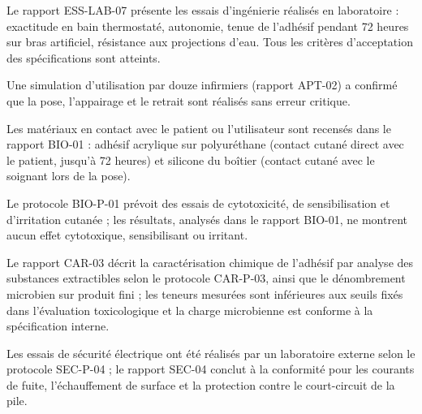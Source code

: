 \documentclass[11pt,a4paper]{article}
\begin{document}
\begin{Form}
\par{}\par

{\small Le rapport ESS-LAB-07 présente les essais d'ingénierie réalisés en laboratoire : exactitude en bain thermostaté, autonomie, tenue de l'adhésif pendant 72 heures sur bras artificiel, résistance aux projections d'eau. Tous les critères d'acceptation des spécifications sont atteints.}\par

{\small Une simulation d'utilisation par douze infirmiers (rapport APT-02) a confirmé que la pose, l'appairage et le retrait sont réalisés sans erreur critique.}\par

\par{}\par

{\small Les matériaux en contact avec le patient ou l'utilisateur sont recensés dans le rapport BIO-01 : adhésif acrylique sur polyuréthane (contact cutané direct avec le patient, jusqu'à 72 heures) et silicone du boîtier (contact cutané avec le soignant lors de la pose).}\par

{\small Le protocole BIO-P-01 prévoit des essais de cytotoxicité, de sensibilisation et d'irritation cutanée ; les résultats, analysés dans le rapport BIO-01, ne montrent aucun effet cytotoxique, sensibilisant ou irritant.}\par

\par{}\par

{\small Le rapport CAR-03 décrit la caractérisation chimique de l'adhésif par analyse des substances extractibles selon le protocole CAR-P-03, ainsi que le dénombrement microbien sur produit fini ; les teneurs mesurées sont inférieures aux seuils fixés dans l'évaluation toxicologique et la charge microbienne est conforme à la spécification interne.}\par

\par{}\par

{\small Les essais de sécurité électrique ont été réalisés par un laboratoire externe selon le protocole SEC-P-04 ; le rapport SEC-04 conclut à la conformité pour les courants de fuite, l'échauffement de surface et la protection contre le court-circuit de la pile.}\par


\end{Form}
\end{document}
